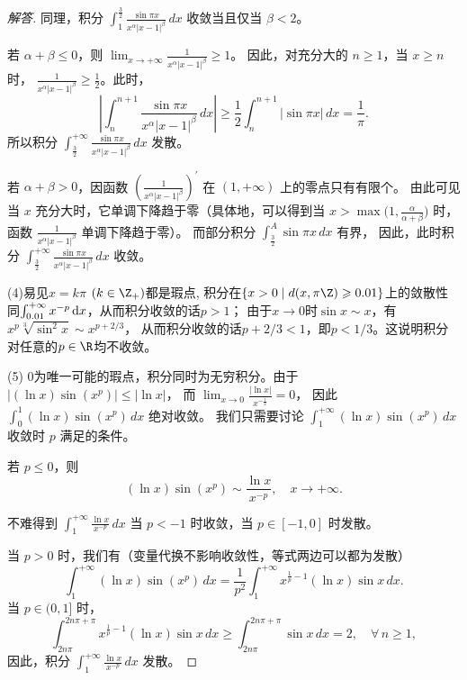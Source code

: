 \begin{a}
\begin{enumerate}
\begin{proof}[解答]
同理，积分 \(\int_1^{\frac{3}{2}} \frac{\sin \pi x}{x^\alpha|x-1|^\beta} \, d x\) 收敛当且仅当 $\beta<2$。

若 $\alpha+\beta \leqslant 0$，则 \(\lim_{x \rightarrow+\infty} \frac{1}{x^\alpha|x-1|^\beta} \geqslant 1\)。
因此，对充分大的 $n \geqslant 1$，当 $x \geqslant n$ 时，
\(\frac{1}{x^\alpha|x-1|^\beta} \geqslant \frac{1}{2}\)。此时，
$$\left|\int_n^{n+1} \frac{\sin \pi x}{x^\alpha|x-1|^\beta} \, d x\right| 
\geqslant \frac{1}{2} \int_n^{n+1}|\sin \pi x| \, d x=\frac{1}{\pi}.$$
所以积分 \(\int_{\frac{3}{2}}^{+\infty} \frac{\sin \pi x}{x^\alpha|x-1|^\beta} \, d x\) 发散。

若 $\alpha+\beta>0$，因函数 \(\left(\frac{1}{x^\alpha|x-1|^\beta}\right)^{\prime}\) 在 $(1,+\infty)$ 上的零点只有有限个。
由此可见当 $x$ 充分大时，它单调下降趋于零（具体地，可以得到当 $x>\max\big(1, \frac{\alpha}{\alpha+\beta}\big)$ 时，
函数 \(\frac{1}{x^\alpha|x-1|^\beta}\) 单调下降趋于零）。
而部分积分 \(\int_{\frac{3}{2}}^A \sin \pi x \, d x\) 有界，
因此，此时积分 \(\int_{\frac{3}{2}}^{+\infty} \frac{\sin \pi x}{x^\alpha|x-1|^\beta} \, d x\) 收敛。

(4)易见\(x=k\pi\) \((k\in\Z_+)\)都是瑕点, 积分在$\{x>0 \mid d(x,\pi\Z)\geqslant0.01\}$上的敛散性
同\(\int_{0.01}^{+\infty}x^{-p}\,{\rm d}x\)，从而积分收敛的话$p>1$；
由于$x\to0$时\(\sin x\sim x\)，有\(x^p\sqrt[3]{\sin^2x} \sim x^{p+2/3}\)，
从而积分收敛的话$p+2/3<1$，即$p<1/3$。这说明积分对任意的$p\in\R$均不收敛。

(5) $0$为唯一可能的瑕点，积分同时为无穷积分。由于 $\left|(\ln x) \sin (x^{p})\right| \leqslant |\ln x|$，
而 \(\lim_{x \rightarrow 0} \frac{|\ln x|}{x^{-\frac{1}{2}}}=0\)，
因此 \(\int_{0}^{1}(\ln x) \sin (x^{p}) \, d x\) 绝对收敛。
我们只需要讨论 \(\int_{1}^{+\infty}(\ln x) \sin (x^{p}) \, d x\) 收敛时 $p$ 满足的条件。

若 $p \leqslant 0$，则
$$(\ln x) \sin (x^{p}) \sim \frac{\ln x}{x^{-p}}, \quad x \rightarrow+\infty.$$

不难得到 \(\int_{1}^{+\infty} \frac{\ln x}{x^{-p}} \, d x\) 当 $p<-1$ 时收敛，当 $p \in[-1,0]$ 时发散。

当 $p>0$ 时，我们有（变量代换不影响收敛性，等式两边可以都为发散）
$$\int_{1}^{+\infty}(\ln x) \sin (x^{p}) \, d x
=\frac{1}{p^{2}} \int_{1}^{+\infty} x^{\frac{1}{p}-1}(\ln x) \sin x \, d x.$$
当 $p \in(0,1]$ 时，
$$\int_{2 n \pi}^{2 n \pi+\pi} x^{\frac{1}{p}-1}(\ln x) \sin x \, d x 
\geqslant \int_{2 n \pi}^{2 n \pi+\pi} \sin x \, d x=2, \quad \forall \, n \geqslant 1,$$
因此，积分 \(\int_{1}^{+\infty} \frac{\ln x}{x^{-p}} \, d x\) 发散。


\end{proof}
\end{enumerate}
\end{a}
